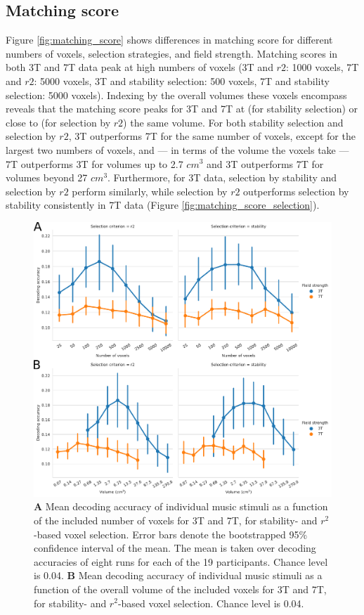 \subsection*{Matching score}

Figure \ref{fig:matching_score} shows differences in matching score
for different numbers of voxels, selection strategies, and field strength.
Matching scores in both 3T and 7T data peak at high numbers of voxels (3T and
$r2$: 1000 voxels, 7T and $r2$: 5000 voxels, 3T and stability selection: 500
voxels, 7T and stability selection: 5000 voxels).
Indexing by the overall volumes these voxels encompass reveals that the matching
score peaks for 3T and 7T at (for stability selection) or close to (for
selection by $r2$) the same volume.
For both stability selection and selection by $r2$, 3T outperforms 7T for the
same number of voxels, except for the largest two numbers of voxels, and --- in
terms of the volume the voxels take --- 7T outperforms 3T for volumes up to 2.7
$cm^{3}$ and 3T outperforms 7T for volumes beyond 27 $cm^{3}$.
Furthermore, for 3T data, selection by stability and selection by $r2$ perform
similarly, while selection by $r2$ outperforms selection by stability
consistently in 7T data (Figure \ref{fig:matching_score_selection}).

\begin{figure}
  \centering
    \includegraphics[width=\linewidth]{pics/decoding.pdf}

	\caption{\textbf{A} Mean decoding accuracy of individual music stimuli as a function of
  the included number of voxels for 3T and 7T, for stability- and
  $r^2$-based voxel selection. Error bars denote the bootstrapped 95\%
  confidence interval of the mean. The mean is taken over decoding
  accuracies of eight runs for each of the 19 participants. Chance level is
    0.04. \textbf{B} Mean
decoding accuracy of individual music stimuli as a function of the overall volume of the
included voxels for 3T and 7T, for stability- and $r^2$-based voxel
selection. Chance level is 0.04.
}
 \label{fig:decoding_accuracy_stimulus}
\end{figure}

